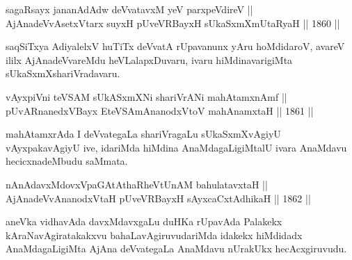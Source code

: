 
\begin{shl}
sagaRsayx jananAdAdw deVvatavxM yeV parxpeVdireV || \\
AjAnadeVvAsetxV\s tarx suyxH pUveVRBayxH sUkaSxmXmUtaRyaH \hfill || 1860 ||
  
\end{shl}

\begin{artha}
saqSiTxya AdiyalelxV huTiTx deVvatA rUpavanunx yAru hoMdidaroV, avareV
ililx AjAnadeVvareMdu heVLalapxDuvaru, ivaru hiMdinavarigiMta
sUkaSxmXshariVradavaru.
\end{artha}


\begin{shl}
vAyxpiVni teVSAM sUkASxmXNi shariVrANi mahAtamxnAmf || \\
pUvARnanedxVBayx EteVSAmAnanodxV\s toV mahAnamxtaH \hfill || 1861 ||
  
\end{shl}

\begin{artha}
mahAtamxrAda I deVvategaLa shariVragaLu sUkaSxmXvAgiyU vAyxpakavAgiyU
ive, idariMda hiMdina AnaMdagaLigiMtalU ivara AnaMdavu hecicxnadeMbudu
saMmata.
\end{artha}

\begin{shl}
nAnAdavxMdovxVpaGAtAthaRheVtUnAM bahulatavxtaH || \\
AjAnadeVvAnanodxV\s taH pUveVRBayxH sAyxcaCxtAdhikaH \hfill || 1862 ||
  
\end{shl}

\begin{artha}
aneVka vidhavAda davxMdavxgaLu duHKa rUpavAda Palakekx kAraNavAgiratakakxvu bahaLavAgiruvudariMda idakekx hiMdidadx AnaMdagaLigiMta AjAna deVvategaLa AnaMdavu nUrakUkx hecAcxgiruvudu.
\end{artha}

